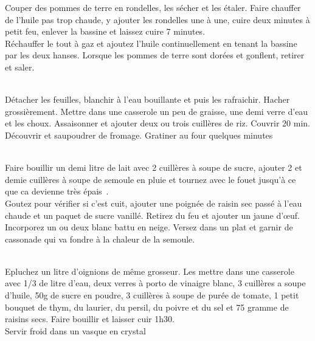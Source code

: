 \begin{minipage}[c]{\textwidth}
Couper des pommes de terre en rondelles, les sécher et les étaler. Faire chauffer de l'huile pas trop chaude, y ajouter les rondelles une à une, cuire deux minutes à petit feu, enlever la bassine et laissez cuire 7 minutes.\\
Réchauffer le tout à gaz et ajoutez l'huile continuellement en tenant la bassine par les deux hanses. Lorsque les pommes de terre sont dorées et gonflent, retirer et saler.\\
\\

\end{minipage}

\begin{minipage}[c]{\textwidth}
Détacher les feuilles, blanchir à l'eau bouillante et puis les rafraichir. Hacher grossièrement. Mettre dans une casserole un peu de graisse, une demi verre d'eau et les choux. Assaisonner et ajouter deux ou trois cuillères de riz. Couvrir 20 min. Découvrir et saupoudrer de fromage. Gratiner au four quelques minutes\\
\\

\end{minipage}

\begin{minipage}[c]{\textwidth}
Faire bouillir un demi litre de lait avec 2 cuillères à soupe de sucre, ajouter 2 et demie cuillères à soupe de semoule en pluie et tournez avec le fouet jusqu'à ce que ca devienne très épais .\\
Goutez pour vérifier si c'est cuit, ajouter une poignée de raisin sec passé à l'eau chaude et un paquet de sucre vanillé. Retirez du feu et ajouter un jaune d'œuf. Incorporez un ou deux blanc battu en neige. Versez dans un plat et garnir de cassonade qui va fondre à la chaleur de la semoule.\\
\\

\end{minipage}

\begin{minipage}[c]{\textwidth}
Epluchez un litre d'oignions de même grosseur. Les mettre dans une casserole avec 1/3 de litre d'eau, deux verres à  porto de vinaigre blanc, 3 cuillères a soupe d'huile, 50g de sucre en poudre, 3 cuillères à soupe de purée de tomate, 1 petit bouquet de thym, du laurier, du persil, du poivre et du sel et 75 gramme de raisins secs. Faire bouillir et laisser cuir 1h30.\\
Servir froid dans un vasque en crystal\\
\\

\end{minipage}

